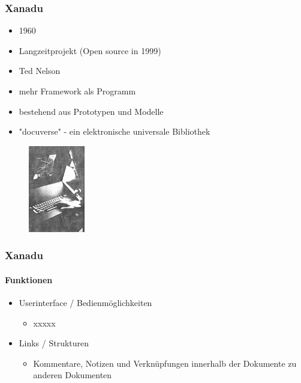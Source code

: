 \begin{frame}
\frametitle{Xanadu}
\begin{itemize}
	\item 1960
	\item Langzeitprojekt (Open source in 1999)
	\item Ted Nelson
	\item mehr Framework als Programm
	\item bestehend aus Prototypen und Modelle
	\item "docuverse" - ein elektronische universale Bibliothek
\end{itemize}

\begin{figure}[htbp]
	\centering
	\includegraphics[width=0.22\textwidth]{images/xanadu}
\end{figure}

\end{frame}

\begin{frame}
\frametitle{Xanadu}
\framesubtitle{Funktionen}
\begin{itemize}
	\item Userinterface / Bedienmöglichkeiten
	\begin{itemize}
		\item xxxxx
	\end{itemize}
	\item Links / Strukturen
	\begin{itemize}
		\item Kommentare, Notizen und Verknüpfungen innerhalb der Dokumente zu anderen Dokumenten
	\end{itemize}
\end{itemize}
\end{frame}
